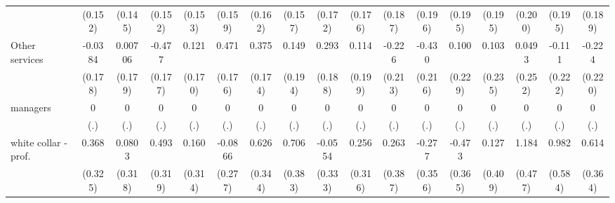 {\begin{tabular}{l*{16}{c}}
                    &     (0.152)         &     (0.145)         &     (0.152)         &     (0.153)         &     (0.159)         &     (0.162)         &     (0.157)         &     (0.172)         &     (0.176)         &     (0.187)         &     (0.196)         &     (0.195)         &     (0.195)         &     (0.200)         &     (0.195)         &     (0.189)         \\
[1em]
Other services      &     -0.0384         &     0.00706         &      -0.477\sym{**} &       0.121         &       0.471\sym{**} &       0.375\sym{*}  &       0.149         &       0.293         &       0.114         &      -0.226         &      -0.430\sym{*}  &       0.100         &       0.103         &      0.0493         &      -0.111         &      -0.224         \\
                    &     (0.178)         &     (0.179)         &     (0.177)         &     (0.170)         &     (0.176)         &     (0.174)         &     (0.194)         &     (0.188)         &     (0.199)         &     (0.213)         &     (0.216)         &     (0.229)         &     (0.235)         &     (0.252)         &     (0.222)         &     (0.220)         \\
[1em]
managers            &           0         &           0         &           0         &           0         &           0         &           0         &           0         &           0         &           0         &           0         &           0         &           0         &           0         &           0         &           0         &           0         \\
                    &         (.)         &         (.)         &         (.)         &         (.)         &         (.)         &         (.)         &         (.)         &         (.)         &         (.)         &         (.)         &         (.)         &         (.)         &         (.)         &         (.)         &         (.)         &         (.)         \\
[1em]
white collar - prof.&       0.368         &      0.0803         &       0.493         &       0.160         &     -0.0866         &       0.626         &       0.706         &     -0.0554         &       0.256         &       0.263         &      -0.277         &      -0.473         &       0.127         &       1.184\sym{*}  &       0.982         &       0.614         \\
                    &     (0.325)         &     (0.318)         &     (0.319)         &     (0.314)         &     (0.277)         &     (0.344)         &     (0.383)         &     (0.333)         &     (0.316)         &     (0.387)         &     (0.356)         &     (0.365)         &     (0.409)         &     (0.477)         &     (0.584)         &     (0.364)         \\

\end{tabular}}
